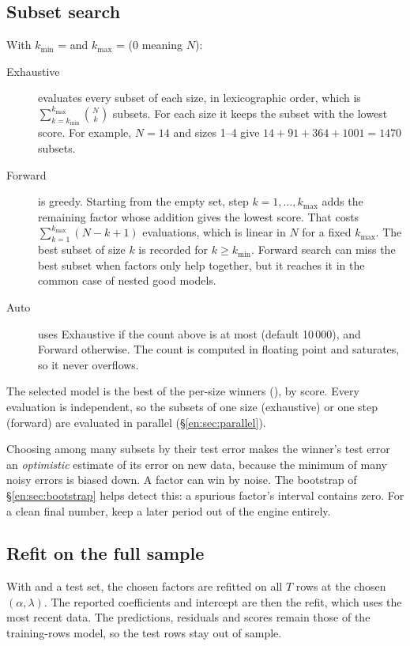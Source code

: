 \subsection{Subset search}\label{en:sec:search}

With $k_{\min}$ =  and $k_{\max}$ =  ($0$ meaning $N$):
\begin{description}
  \item[Exhaustive] evaluates every subset of each size, in lexicographic order, which is
        $\sum_{k=k_{\min}}^{k_{\max}}\binom Nk$ subsets. For each size it keeps the subset with
        the lowest score. For example, $N=14$ and sizes 1--4 give $14+91+364+1001=1470$
        subsets.
  \item[Forward] is greedy. Starting from the empty set, step $k=1,\dots,k_{\max}$ adds the
        remaining factor whose addition gives the lowest score. That costs
        $\sum_{k=1}^{k_{\max}}(N-k+1)$ evaluations, which is linear in $N$ for a fixed
        $k_{\max}$. The best subset of size $k$ is recorded for $k\ge k_{\min}$. Forward
        search can miss the best subset when factors only help together, but it reaches it
        in the common case of nested good models.
  \item[Auto] uses Exhaustive if the count above is at most 
        (default 10\,000), and Forward otherwise. The count is computed in floating point and
        saturates, so it never overflows.
\end{description}
The selected model is the best of the per-size winners (), by score. Every
evaluation is independent, so the subsets of one size (exhaustive) or one step (forward) are
evaluated in parallel (\S\ref{en:sec:parallel}).

\begin{remark}
Choosing among many subsets by their test error makes the winner's test error an
\emph{optimistic} estimate of its error on new data, because the minimum of many noisy
errors is biased down. A factor can win by noise. The bootstrap of \S\ref{en:sec:bootstrap}
helps detect this: a spurious factor's interval contains zero. For a clean final number,
keep a later period out of the engine entirely.
\end{remark}

\subsection{Refit on the full sample}\label{en:sec:refit}
With  and a test set, the chosen factors are refitted on all $T$
rows at the chosen $(\alpha,\lambda)$. The reported coefficients and intercept are then the
refit, which uses the most recent data. The predictions, residuals and scores remain those of
the training-rows model, so the test rows stay out of sample.

